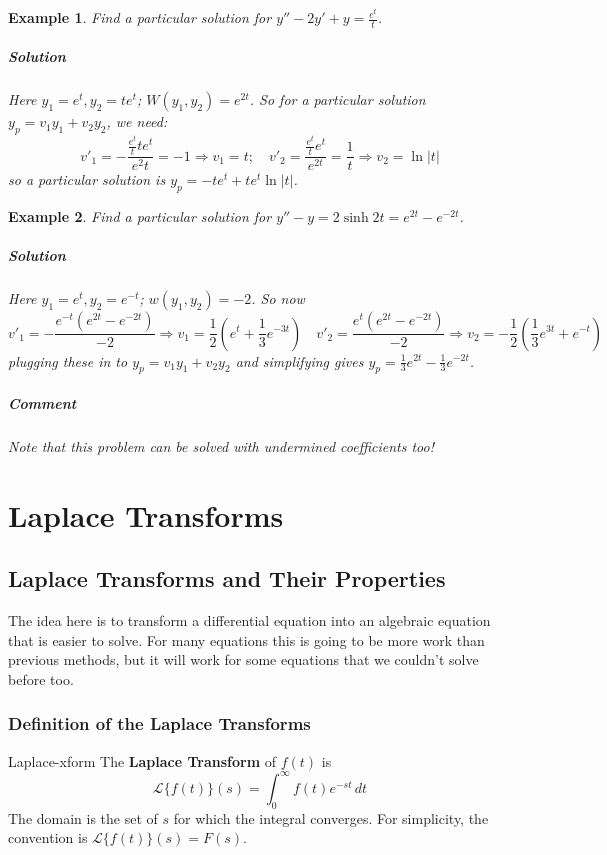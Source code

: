 \documentclass[letterpaper, 11pt, openany]{book}
\theoremstyle{mytheoremstyle}
\theoremstyle{myexamplestyle}
\newtheorem{example}{Example}[section]
\newenvironment{solution}{\paragraph{\sffamily \smaller \fontseries{b}\selectfont Solution}}{\hfill\faSquare}
\newenvironment{commentary}{\paragraph{\sffamily \smaller \fontseries{b}\selectfont Comment}}{}
\begin{document}
\begin{example}\label{e:de-2vop-exp}
    Find a particular solution for \(y'' - 2y' + y = \frac{e^t}{t}\).
    \begin{solution}
        Here \(y_1 = e^t, y_2 = t e^t\); \(W(y_1, y_2) = e^{2t}\). So for a particular solution \(y_p = v_1 y_1 + v_2 y_2\), we need:
        \[v'_1 = -\frac{\frac{e^t}{t} t e^t}{e^2t} = -1 \Rightarrow v_1 = t; \quad v'_2 = \frac{\frac{e^t}{t} e^t}{e^{2t}} = \frac{1}{t} \Rightarrow v_2 = \ln |t|\]
        so a particular solution is \(y_p = -t e^t + t e^t \ln |t|\).
    \end{solution}
\end{example}

\begin{example}\label{e:de-2vop-sinh}
    Find a particular solution for \(y'' - y = 2 \sinh 2t = e^{2t} - e^{-2t}\).
    \begin{solution}
        Here \(y_1 = e^t, y_2 = e^{-t}\); \(w(y_1, y_2) = -2\). So now
        \[v'_1 = - \frac{e^{-t}(e^{2t} - e^{-2t})}{-2} \Rightarrow v_1 = \frac{1}{2}\left(e^t + \frac{1}{3}e^{-3t}\right) \quad v'_2 = \frac{e^{t}(e^{2t} - e^{-2t})}{-2} \Rightarrow v_2 = -\frac{1}{2}\left(\frac{1}{3}e^{3t} + e^{-t}\right)\]
        plugging these in to \(y_p = v_1 y_1 + v_2 y_2\) and simplifying gives \(y_p = \frac{1}{3}e^{2t} - \frac{1}{3}e^{-2t}\).
    \end{solution}
    \begin{commentary}
        Note that this problem can be solved with undermined coefficients too! \faSmile
    \end{commentary}
\end{example}

\newpage\thispagestyle{firstofchapter}
\chapter{Laplace Transforms}
\setcounter{figure}{0}
\section{Laplace Transforms and Their Properties}
\setcounter{figure}{0}
The idea here is to transform a differential equation into an algebraic equation that is easier to solve. For many equations this is going to be more work than previous methods, but it will work for some equations that we couldn't solve before too.
\subsection{Definition of the Laplace Transforms}
\begin{definition}{}{Laplace-xform}
    The \textbf{Laplace Transform} of \(f(t)\) is
    \[\mathcal{L}\{f(t)\}(s) = \int_0^{\infty} f(t) e^{-st} \, dt\]
    The domain is the set of \(s\) for which the integral converges. For simplicity, the convention is \(\mathcal{L}\{f(t)\}(s) = F(s)\). 
\end{definition}
\end{document}
